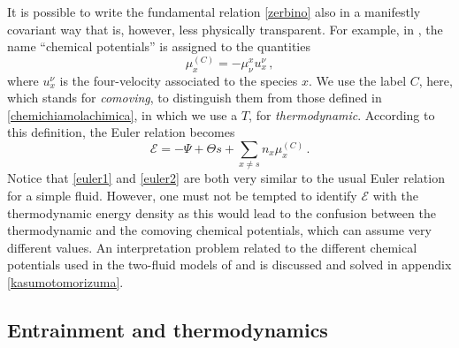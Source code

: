 \documentclass[usenatbib]{mnras}
\begin{document}
It is possible to write the fundamental relation \eqref{zerbino} also in a manifestly covariant way that is, however, less physically transparent. For example, in \cite{prix2005}, the name  ``chemical potentials'' is assigned to the quantities
%
\begin{equation}\label{comcomcomcomcocm}
\mu_x^{(C)} = -\mu^x_\nu u_x^\nu \, ,
\end{equation}
%
where $u_x^\nu$ is the four-velocity associated to the species $x$. We use the label $C$, here, which stands for \textit{comoving}, to distinguish them from those defined in \eqref{chemichiamolachimica}, in which we use a $T$, for \textit{thermodynamic}. According to this definition, the Euler relation becomes \citep[see also ][]{rezzolla_book}
%
\begin{equation}\label{euler1}
\mathcal{E} = -\Psi + \Theta s + \sum_{x \neq s} n_x \mu_x^{(C)} \, . 
\end{equation} 
%
Notice that \eqref{euler1} and \eqref{euler2} are both very similar to the usual Euler relation for a simple fluid. However, one must not be tempted to identify $\mathcal{E}$ with the thermodynamic energy density as this would lead to the confusion between the thermodynamic and the comoving chemical potentials, which can assume very different values. An interpretation problem related to the different chemical potentials used in the two-fluid models of \cite{pca2002} and \cite{KP2017} is discussed and solved in appendix \ref{kasumotomorizuma}.



\subsection{Entrainment and thermodynamics}\label{entrainment and thermodyanmics}
\end{document}
